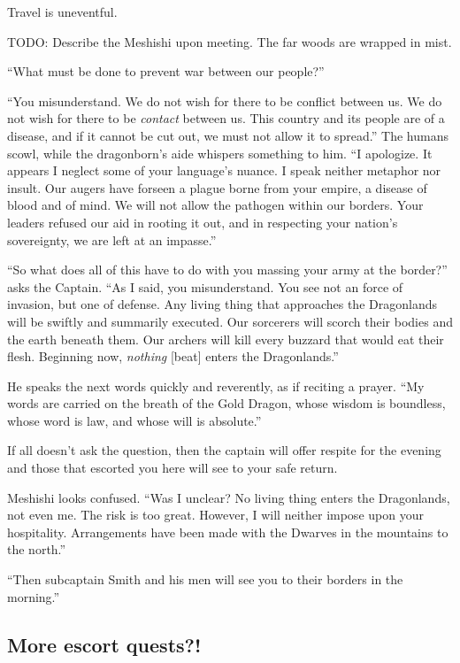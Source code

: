 \begin{multicols}{2}
Travel is uneventful.

TODO: Describe the Meshishi upon meeting.
The far woods are wrapped in mist.

``What must be done to prevent war between our people?''

  \begin{aloud}
  ``You misunderstand.
    We do not wish for there to be conflict between us.
    We do not wish for there to be \emph{contact} between us.
    This country and its people are of a disease,
      and if it cannot be cut out, we must not allow it to spread.''
    The humans scowl, while the dragonborn's aide whispers something to him.
  ``I apologize.
    It appears I neglect some of your language's nuance.
    I speak neither metaphor nor insult.
    Our augers have forseen a plague borne from your empire, a disease of blood and of mind.
    We will not allow the pathogen within our borders.
    Your leaders refused our aid in rooting it out, and in respecting your nation's sovereignty,
      we are left at an impasse.''

  ``So what does all of this have to do with you massing your army at the border?''
     asks the Captain.
  ``As I said, you misunderstand.
    You see not an force of invasion, but one of defense.
    Any living thing that approaches the Dragonlands will be swiftly and summarily executed.
    Our sorcerers will scorch their bodies and the earth beneath them.
    Our archers will kill every buzzard that would eat their flesh.
    Beginning now, \emph{nothing} [beat] enters the Dragonlands.''

    He speaks the next words quickly and reverently, as if reciting a prayer.
  ``My words are carried on the breath of the Gold Dragon,
      whose wisdom is boundless, whose word is law, and whose will is absolute.''
  \end{aloud}

If all doesn't ask the question, then the captain will offer respite for the evening and
  those that escorted you here will see to your safe return.

Meshishi looks confused.
``Was I unclear?
  No living thing enters the Dragonlands, not even me.
  The risk is too great.
  However, I will neither impose upon your hospitality.
  Arrangements have been made with the Dwarves in the mountains to the north.''

``Then subcaptain Smith and his men will see you to their borders in the morning.''

\subsection{More escort quests?!}


\end{multicols}
